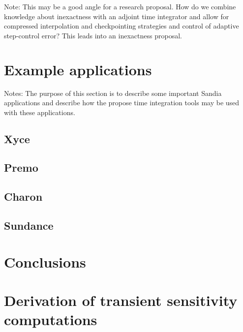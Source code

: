 \documentclass[pdf,ps2pdf,11pt]{SANDreport}
\begin{document}
Note: This may be a good angle for a research proposal.  How do we combine
knowledge about inexactness with an adjoint time integrator and allow for
compressed interpolation and checkpointing strategies and control of adaptive
step-control error?  This leads into an inexactness proposal.

\section{Example applications}

Notes: The purpose of this section is to describe some important Sandia
applications and describe how the propose time integration tools may be used
with these applications.

\subsection{Xyce}

\subsection{Premo}

\subsection{Charon}

\subsection{Sundance}

\section{Conclusions}

%
\clearpage



%
\appendix

\section{Derivation of transient sensitivity computations}
\label{rythmos:app:sens-derivations}
\end{document}
